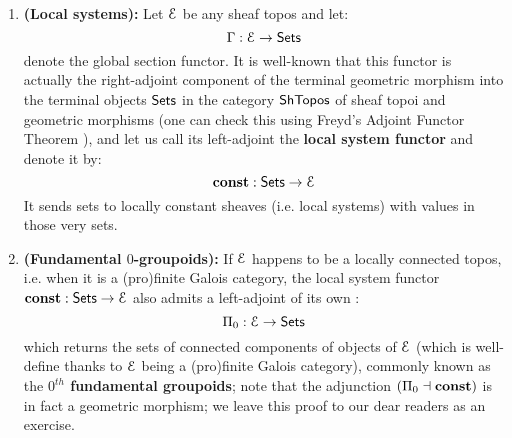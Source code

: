                 \begin{definition} \label{def: fundamental_groupoids}
                    \noindent
                    \begin{enumerate}
                        \item \textbf{(Local systems):} Let $\mathcal{E}$ be any sheaf topos and let:
                            $$\Gamma: \mathcal{E} \to \mathsf{Sets}$$
                        denote the global section functor. It is well-known that this functor is actually the right-adjoint component of the terminal geometric morphism into the terminal objects $\mathsf{Sets}$ in the category $\mathsf{Sh}\mathsf{Topos}$ of sheaf topoi and geometric morphisms (one can check this using Freyd's Adjoint Functor Theorem \cite[Theorem V.6.2]{maclane}), and let us call its left-adjoint the \textbf{local system functor} and denote it by:
                            $$\mathbf{const}: \mathsf{Sets} \to \mathcal{E}$$
                        It sends sets to locally constant sheaves (i.e. local systems) with values in those very sets.
                        \item \textbf{(Fundamental $0$-groupoids):} If $\mathcal{E}$ happens to be a locally connected topos, i.e. when it is a (pro)finite Galois category, the local system functor $\mathbf{const}: \mathsf{Sets} \to \mathcal{E}$ also admits a left-adjoint of its own :
                            $$\Pi_0: \mathcal{E} \to \mathsf{Sets}$$
                        which returns the sets of connected components of objects of $\mathcal{E}$ (which is well-define thanks to $\mathcal{E}$ being a (pro)finite Galois category), commonly known as the \textbf{$0^{th}$ fundamental groupoids}; note that the adjunction $(\Pi_0 \dashv \mathbf{const})$ is in fact a geometric morphism; we leave this proof to our dear readers as an exercise. 
                    \end{enumerate} 
                \end{definition}
                
